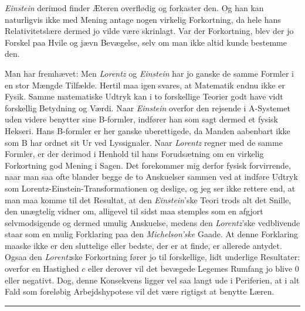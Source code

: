 \documentclass[12pt,a4paper]{article}
\begin{document}
\emph{Einstein} derimod finder Æteren overflødig og forkaster den. Og han kan
naturligvis ikke med Mening antage nogen virkelig Forkortning, da hele hans
Relativitetslære dermed jo vilde være skrinlagt. Var der Forkortning, blev der
jo Forskel paa Hvile og jævn Bevægelse, selv om man ikke altid kunde bestemme
den.

Man har fremhævet: Men \emph{Lorentz} og \emph{Einstein} har jo ganske de samme
Formler i en stor Mængde Tilfælde. Hertil maa igen svares, at Matematik endnu
ikke er Fysik. Samme matematiske Udtryk kan i to forskellige Teorier godt have
vidt forskellig Betydning og Værdi. Naar \emph{Einstein} overfor den rejsende i
A-Systemet uden videre benytter sine B-formler, indfører han som sagt dermed et
fysisk Hekseri. Hans B-formler er her ganske uberettigede, da Manden aabenbart
ikke som B har ordnet sit Ur ved Lyssignaler. Naar \emph{Lorentz} regner med de
samme Formler, er der derimod i Henhold til hans Forudsætning om en virkelig
Forkortning god Mening i Sagen. Det forekommer mig derfor fysisk forvirrende,
naar man saa ofte blander begge de to Anskuelser sammen ved at indføre Udtryk
som \guillemotright Lorentz-Einstein-Transformationen\guillemotleft{} og
deslige, og jeg ser ikke rettere end, at man maa komme til det Resultat, at den
\emph{Einstein}'ske Teori trods alt det Snille, den unægtelig vidner om,
alligevel til sidst maa stemples som en afgjort selvmodsigende og dermed umulig
Anskuelse, medens den \emph{Lorentz}'ske vedblivende staar som en mulig
Forklaring paa den \emph{Michelson'ske} Gaade. At denne Forklaring maaske ikke
er den sluttelige eller bedste, der er at finde, er allerede antydet. Ogsaa den
\emph{Lorentz}ske Forkortning fører jo til forskellige, lidt underlige
Resultater: overfor en Hastighed $c$ eller derover vil det bevægede Legemes
Rumfang jo blive 0 eller negativt. Dog, denne Konsekvens ligger vel saa langt
ude i Periferien, at i alt Fald som foreløbig Arbejdshypotese vil det være
rigtigst at benytte Læren.

\begin{center}
\rule{0.16\textwidth}{0.5pt}
\end{center}
\end{document}
